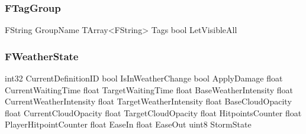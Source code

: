 \subsubsection{FTagGroup}
\begin{code}
FString                                     GroupName
TArray<FString>                             Tags
bool                                        LetVisibleAll
\end{code}

\subsubsection{FWeatherState}
\begin{code}
int32                                       CurrentDefinitionID
bool                                        IsInWeatherChange
bool                                        ApplyDamage
float                                       CurrentWaitingTime
float                                       TargetWaitingTime
float                                       BaseWeatherIntensity
float                                       CurrentWeatherIntensity
float                                       TargetWeatherIntensity
float                                       BaseCloudOpacity
float                                       CurrentCloudOpacity
float                                       TargetCloudOpacity
float                                       HitpointsCounter
float                                       PlayerHitpointCounter
float                                       EaseIn
float                                       EaseOut
uint8                                       StormState
\end{code}